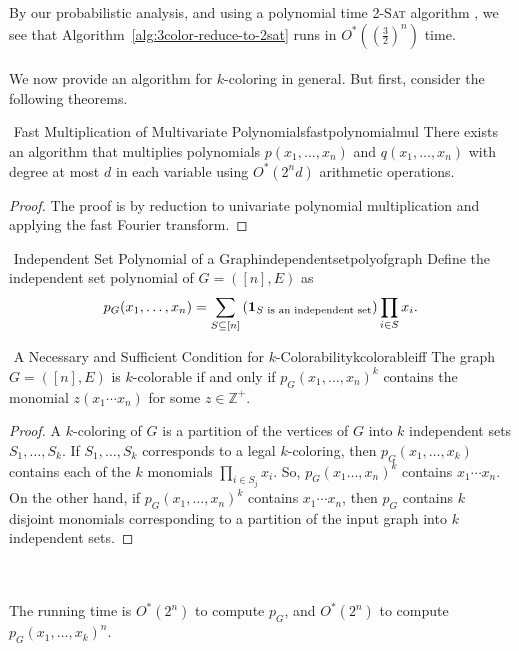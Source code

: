         By our probabilistic analysis, and using a polynomial time \textsc{2-Sat} algorithm , we see that Algorithm~\ref{alg:3color-reduce-to-2sat} runs in \(O^*\left(\left(\frac{3}{2}\right)^n\right)\) time.
        \\
        \\
        We now provide an algorithm for \(k\)-coloring in general. But first, consider the following theorems.
        \begin{theorem}{\Stop\,\,Fast Multiplication of Multivariate Polynomials}{fastpolynomialmul}
            There exists an algorithm that multiplies polynomials \(p(x_1,\ldots,x_n)\) and \(q(x_1,\ldots,x_n)\) with degree at most \(d\) in each variable using \(O^*(2^nd)\) arithmetic operations.
            \begin{proof}
                The proof is by reduction to univariate polynomial multiplication and applying the fast Fourier transform.
            \end{proof}
        \end{theorem}
        \begin{definition}{\Stop\,\,Independent Set Polynomial of a Graph}{independentsetpolyofgraph}
            Define the independent set polynomial of \(G=([n],E)\) as
            \begin{equation*}
                p_G(x_1,\ldots,x_n)=\sum_{S\subseteq[n]}\left(\mathbf{1}_{S\text{ is an independent set}}\right)\prod_{i\in S}x_i.
            \end{equation*}
        \end{definition}
        \begin{theorem}{\Stop\,\,A Necessary and Sufficient Condition for \(k\)-Colorability}{kcolorableiff}
            The graph \(G=([n],E)\) is \(k\)-colorable if and only if \(p_G(x_1,\ldots,x_n)^k\) contains the monomial \(z(x_1\cdots x_n)\) for some \(z\in\mathbb{Z}^+\).
            \begin{proof}
                A \(k\)-coloring of \(G\) is a partition of the vertices of \(G\) into \(k\) independent sets \(S_1,\ldots,S_k\). If \(S_1,\ldots,S_k\) corresponds to a legal \(k\)-coloring, then \(p_G(x_1,\ldots,x_k)\) contains each of the \(k\) monomials \(\prod_{i\in S_j}x_i\). So, \(p_G(x_1\ldots,x_n)^k\) contains \(x_1\cdots x_n\). On the other hand, if \(p_G(x_1,\ldots,x_n)^k\) contains \(x_1\cdots x_n\), then \(p_G\) contains \(k\) disjoint monomials corresponding to a partition of the input graph into \(k\) independent sets.
            \end{proof}
        \end{theorem}
        \vphantom
        \\
        \\
        The running time is \(O^*(2^n)\) to compute \(p_G\), and \(O^*(2^n)\) to compute \(p_G(x_1,\ldots,x_k)^n\). 